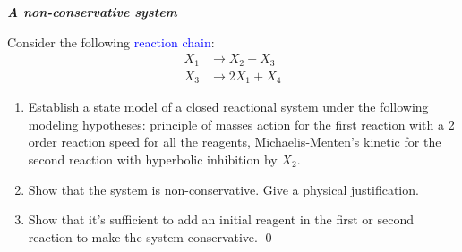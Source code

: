 \begin{exercice}{\bf \em A non-conservative system}

Consider the following \textcolor{blue}{reaction chain}:
\begin{equation*} \begin{split} 
X_1   &\longrightarrow X_2 + X_3 \\
X_3 &\longrightarrow 2X_1 + X_4
\end{split} \end{equation*}
\begin{enumerate}
\item Establish a state model of a closed reactional system under the following modeling hypotheses: principle of masses action for the first reaction with a 2 order reaction speed for all the reagents, Michaelis-Menten’s kinetic for the second reaction with hyperbolic inhibition by $X_2$.
\item Show that the system is non-conservative. Give a physical justification.
\item Show that it’s sufficient to add an initial reagent in the first or second reaction to make the system conservative. \qed
\end{enumerate}
\end{exercice}


  

